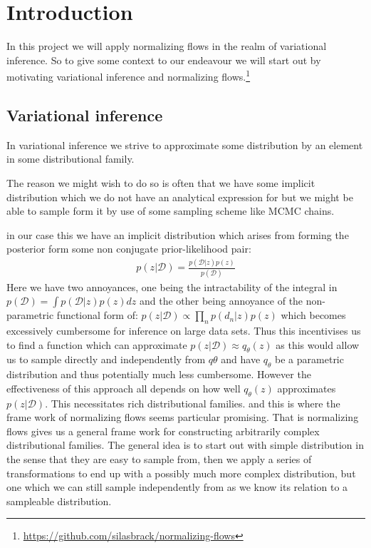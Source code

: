\section{Introduction}
In this project we will apply normalizing flows in the realm of variational inference.
So to give some context to our endeavour we will start out by motivating variational inference and normalizing flows.\footnote{\url{https://github.com/silasbrack/normalizing-flows}}

\subsection{Variational inference}

In variational inference we strive to approximate some distribution by an element in some distributional family.

The reason we might wish to do so is often that we have some implicit distribution which we do not have an analytical expression for but we might be able to sample form it by use of some sampling scheme like MCMC chains.

in our case this we have an implicit distribution which arises from forming the posterior form some non conjugate prior-likelihood pair:
\begin{align*}
    p(z|\mathcal{D})=\frac{p(\mathcal{D}|z)p(z)}{p(\mathcal{D})}
\end{align*}
Here we have two annoyances, one being the intractability of the integral in $p(\mathcal{D})=\int p(\mathcal{D}|z)p(z)dz$ and the other being annoyance of the non-parametric functional form of: $p(z|\mathcal{D})\propto \prod_n p(d_n|z)p(z)$
which becomes excessively cumbersome for inference on large data sets. Thus this incentivises us to find a function which can approximate $p(z|\mathcal{D})\approx q_\theta(z)$ as this would allow us to sample directly and independently from $q\theta$ and have $q_\theta$ be a parametric distribution and thus potentially much less cumbersome.
However the effectiveness of this approach all depends on how well $q_\theta(z)$ approximates $p(z|\mathcal{D})$.
This necessitates rich distributional families.
and this is where the frame work of normalizing flows seems particular promising.
That is normalizing flows gives us a general frame work for constructing arbitrarily complex distributional families.
The general idea is to start out with simple distribution in the sense that they are easy to sample from, then we apply a series of transformations to end up with a possibly much more complex distribution, but one which we can still sample independently from as we know its relation to a sampleable distribution.

